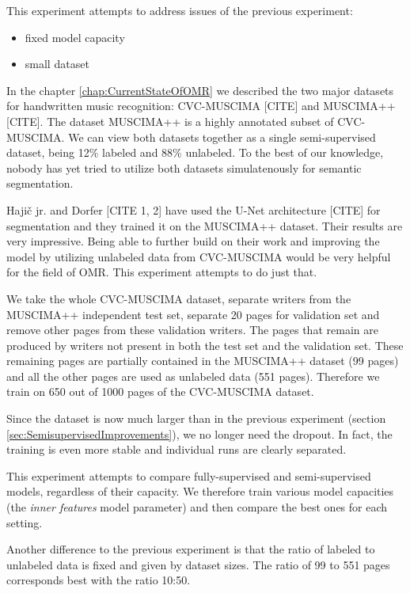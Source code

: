 This experiment attempts to address issues of the previous experiment:

\begin{itemize}
    \item fixed model capacity
    \item small dataset
\end{itemize}

In the chapter \ref{chap:CurrentStateOfOMR} we described the two major datasets for handwritten music recognition: CVC-MUSCIMA [CITE] and MUSCIMA++ [CITE]. The dataset MUSCIMA++ is a highly annotated subset of CVC-MUSCIMA. We can view both datasets together as a single semi-supervised dataset, being 12\% labeled and 88\% unlabeled. To the best of our knowledge, nobody has yet tried to utilize both datasets simulatenously for semantic segmentation.

Hajič jr. and Dorfer [CITE 1, 2] have used the U-Net architecture [CITE] for segmentation and they trained it on the MUSCIMA++ dataset. Their results are very impressive. Being able to further build on their work and improving the model by utilizing unlabeled data from CVC-MUSCIMA would be very helpful for the field of OMR. This experiment attempts to do just that.

We take the whole CVC-MUSCIMA dataset, separate writers from the MUSCIMA++ independent test set, separate 20 pages for validation set and remove other pages from these validation writers. The pages that remain are produced by writers not present in both the test set and the validation set. These remaining pages are partially contained in the MUSCIMA++ dataset (99 pages) and all the other pages are used as unlabeled data (551 pages). Therefore we train on 650 out of 1000 pages of the CVC-MUSCIMA dataset.

Since the dataset is now much larger than in the previous experiment (section \ref{sec:SemisupervisedImprovements}), we no longer need the dropout. In fact, the training is even more stable and individual runs are clearly separated.

This experiment attempts to compare fully-supervised and semi-supervised models, regardless of their capacity. We therefore train various model capacities (the \emph{inner features} model parameter) and then compare the best ones for each setting.

Another difference to the previous experiment is that the ratio of labeled to unlabeled data is fixed and given by dataset sizes. The ratio of 99 to 551 pages corresponds best with the ratio 10:50.

